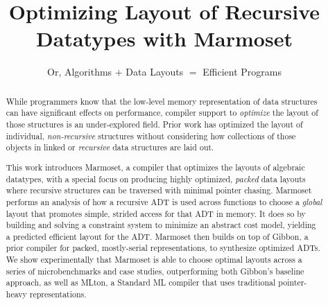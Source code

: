 \documentclass[acmsmall,review,anonymous]{acmart}\settopmatter{printfolios=true,printccs=false,printacmref=false}
\newcommand{\system}{{\sc Marmoset}\xspace}
\newcommand{\gibbon}{{\sc Gibbon}\xspace}
\newcommand{\mlton}{{\sc MLton}\xspace}
\begin{document}
\title{Optimizing Layout of Recursive Datatypes with Marmoset}
\subtitle{Or, Algorithms ${+}$ Data Layouts ${=}$ Efficient Programs}



























\begin{abstract}


While programmers know that the low-level memory representation of data structures can have significant effects 
on performance, compiler support to {\em optimize} the layout of those structures is an under-explored field.
Prior work has optimized the layout of individual, \textit{non-recursive} structures without considering how
collections of those objects in linked or \textit{recursive} data structures are laid out.




This work introduces \system, a compiler that optimizes the layouts of algebraic datatypes, with a special focus
on producing highly optimized, {\em packed} data layouts where recursive structures can be traversed with minimal
pointer chasing. \system performs an analysis of how a recursive ADT is used across functions to choose a \textit{global} layout
that promotes simple, strided access for that ADT in memory. It does so by building and solving a constraint system
to minimize an abstract cost model, yielding a predicted efficient layout for the ADT. \system then builds on top
of \gibbon, a prior compiler for packed, mostly-serial representations, to synthesize optimized ADTs. We show experimentally 
that \system is able to choose optimal layouts across a series of microbenchmarks and case studies, outperforming both 
\gibbon's baseline approach, as well as \mlton, a Standard ML compiler that uses traditional
pointer-heavy representations.




\end{abstract}
 \maketitle
\end{document}
